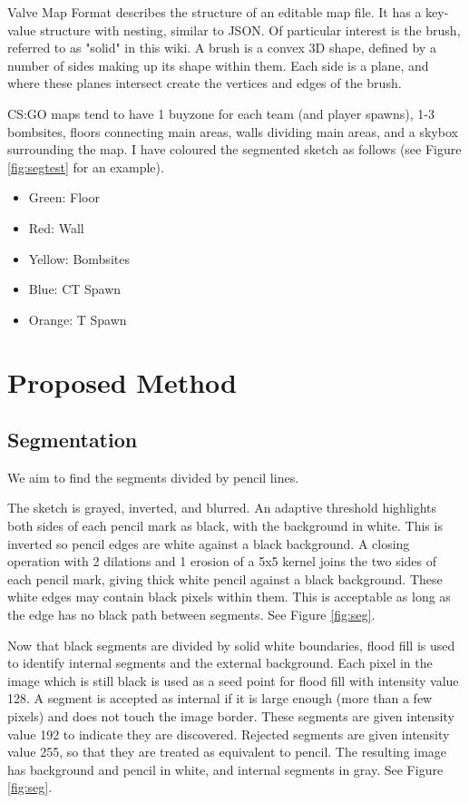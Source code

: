 \documentclass[conference]{IEEEtran}
\begin{document}
Valve Map Format \cite{valve2006vmf} describes the structure of an editable map file. It has a key-value structure with nesting, similar to JSON. Of particular interest is the brush, referred to as "solid" in this wiki. A brush is a convex 3D shape, defined by a number of sides making up its shape within them. Each side is a plane, and where these planes intersect create the vertices and edges of the brush.

CS:GO maps tend to have 1 buyzone for each team (and player spawns), 1-3 bombsites, floors connecting main areas, walls dividing main areas, and a skybox surrounding the map. I have coloured the segmented sketch as follows (see Figure \ref{fig:segtest} for an example).
\begin{itemize}
\item Green: Floor
\item Red: Wall
\item Yellow: Bombsites
\item Blue: CT Spawn
\item Orange: T Spawn
\end{itemize}

\section{Proposed Method}
\subsection{Segmentation}
We aim to find the segments divided by pencil lines.

The sketch is grayed, inverted, and blurred. An adaptive threshold highlights both sides of each pencil mark as black, with the background in white. This is inverted so pencil edges are white against a black background. A closing operation with 2 dilations and 1 erosion of a 5x5 kernel joins the two sides of each pencil mark, giving thick white pencil against a black background. These white edges may contain black pixels within them. This is acceptable as long as the edge has no black path between segments. See Figure \ref{fig:seg}.

Now that black segments are divided by solid white boundaries, flood fill is used to identify internal segments and the external background. Each pixel in the image which is still black is used as a seed point for flood fill with intensity value 128. A segment is accepted as internal if it is large enough (more than a few pixels) and does not touch the image border. These segments are given intensity value 192 to indicate they are discovered. Rejected segments are given intensity value 255, so that they are treated as equivalent to pencil. The resulting image has background and pencil in white, and internal segments in gray. See Figure \ref{fig:seg}.
\end{document}
